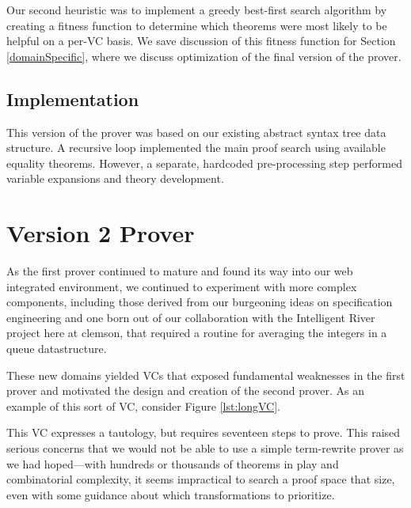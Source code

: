 Our second heuristic was to implement a greedy best-first search algorithm by creating a fitness function to determine which theorems were most likely to be helpful on a per-VC basis.  We save discussion of this fitness function for Section \ref{domainSpecific}, where we discuss optimization of the final version of the prover.

	\subsection{Implementation}

This version of the prover was based on our existing abstract syntax tree data structure.  A recursive loop implemented the main proof search using available equality theorems.  However, a separate, hardcoded pre-processing step performed variable expansions and theory development.


\section{Version 2 Prover\label{proverV2}}

As the first prover continued to mature and found its way into our web integrated environment, we continued to experiment with more complex components, including those derived from our burgeoning ideas on specification engineering\cite{specEngineering} and one born out of our collaboration with the Intelligent River project here at clemson, that required a routine for averaging the integers in a queue datastructure\cite{queueAverage}.  

These new domains yielded VCs that exposed fundamental weaknesses in the first prover and motivated the design and creation of the second prover.  As an example of this sort of VC, consider Figure \ref{lst:longVC}.



This VC expresses a tautology, but requires seventeen steps to prove.  This raised serious concerns that we would not be able to use a simple term-rewrite prover as we had hoped---with hundreds or thousands of theorems in play and combinatorial complexity, it seems impractical to search a proof space that size, even with some guidance about which transformations to prioritize.

